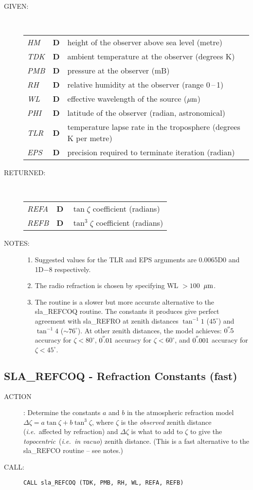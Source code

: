 \documentclass[11pt,twoside]{article}
\newcommand{\xlabel}[1]{}
\newcommand{\arcsec}[2] {\arcseci{#1}$\hspace{-0.4em}.#2$}
\newcommand{\arcsec}[2] {
      {$#1\hspace{-0.05em}^{'\hspace{-0.1em}'}\hspace{-0.4em}.#2$}
   }
\newcommand{\arcseci}[1] {$#1\hspace{-0.05em}$\raisebox{-0.5ex}
                         {$^{'\hspace{-0.1em}'}$}}
\renewcommand{\arcseci}[1] {$#1\hspace{-0.05em}^{'\hspace{-0.1em}'}$}
\newcommand{\routine}[3]
{\hbadness=10000
  \vbox
  {
    \rule{\textwidth}{0.3mm}\\
    {\Large {\bf #1} \hfill #2 \hfill {\bf #1}}\\
    \setlength{\oldspacing}{\topsep}
    \setlength{\topsep}{0.3ex}
    \begin{description}
      #3
    \end{description}
    \setlength{\topsep}{\oldspacing}
  }
}
\renewcommand{\routine}[3]
   {
      \subsection{#1\xlabel{#1} - #2\label{#1}}
       \begin{description}
         #3
       \end{description}
   }
\newcommand{\action}[1]
{\item[ACTION]: #1}
\newcommand{\action}[1]
   {\item[ACTION:] #1}
\newcommand{\call}[1]
{\item[CALL]: \hspace{0.4em}{\tt #1}}
\newlength{\oldspacing}
\renewcommand{\call}[1]
   {
    \item[CALL:] {\tt #1}
   }
\newcommand{\args}[2]
{
  \goodbreak
  \setlength{\oldspacing}{\topsep}
  \setlength{\topsep}{0.3ex}
  \begin{description}
  \item[#1]:\\[1.5ex]
    \begin{tabular}{p{7em}p{6em}p{22em}}
      #2
    \end{tabular}
  \end{description}
  \setlength{\topsep}{\oldspacing}
}
\renewcommand{\args}[2]
   {
     \begin{description}
        \item[#1:]\\
        \begin{tabular}{p{7em}p{6em}l}
           #2
        \end{tabular}
     \end{description}
   }
\newcommand{\spec}[3]
{
  {\em {#1}} & {\bf \mbox{#2}} & {#3}
}
\newcommand{\notes}[1]
{
  \goodbreak
  \setlength{\oldspacing}{\topsep}
  \setlength{\topsep}{0.3ex}
  \begin{description}
    \item[NOTES]:
        #1
  \end{description}
  \setlength{\topsep}{\oldspacing}
}
\renewcommand{\notes}[1]
   {
      \begin{description}
         \item[NOTES:]
            #1
      \end{description}
   }
\begin{document}
\args{GIVEN}
{
 \spec{HM}{D}{height of the observer above sea level (metre)} \\
 \spec{TDK}{D}{ambient temperature at the observer (degrees K)} \\
 \spec{PMB}{D}{pressure at the observer (mB)} \\
 \spec{RH}{D}{relative humidity at the observer (range 0\,--\,1)} \\
 \spec{WL}{D}{effective wavelength of the source ($\mu{\rm m}$)} \\
 \spec{PHI}{D}{latitude of the observer (radian, astronomical)} \\
 \spec{TLR}{D}{temperature lapse rate in the troposphere
                                     (degrees K per metre)} \\
 \spec{EPS}{D}{precision required to terminate iteration (radian)}
}
\args{RETURNED}
{
 \spec{REFA}{D}{$\tan \zeta$ coefficient (radians)} \\
 \spec{REFB}{D}{$\tan^{3} \zeta$ coefficient (radians)}
}
\notes
{
 \begin{enumerate}
  \item Suggested values for the TLR and EPS arguments are 0.0065D0 and
        1D$-$8 respectively.
  \item The radio refraction is chosen by specifying WL $>100$~$\mu{\rm m}$.
  \item The routine is a slower but more accurate alternative to the
        sla\_REFCOQ routine.  The constants it produces give perfect
        agreement with sla\_REFRO at zenith distances
        $\tan^{-1} 1$ ($45^\circ$) and $\tan^{-1} 4$ ($\sim 76^\circ$).
        At other zenith distances, the model achieves:
        \arcsec{0}{5} accuracy for $\zeta<80^{\circ}$,
        \arcsec{0}{01} accuracy for $\zeta<60^{\circ}$, and
        \arcsec{0}{001} accuracy for $\zeta<45^{\circ}$.
 \end{enumerate}
}
\routine{SLA\_REFCOQ}{Refraction Constants (fast)}
{
 \action{Determine the constants $a$ and $b$ in the
         atmospheric refraction model
         $\Delta \zeta = a \tan \zeta + b \tan^{3} \zeta$,
         where $\zeta$ is the {\it observed}\/ zenith distance
         ({\it i.e.}\ affected by refraction) and $\Delta \zeta$ is
         what to add to $\zeta$ to give the {\it topocentric}\,
         ({\it i.e.\ in vacuo}) zenith distance. (This is a fast
         alternative to the sla\_REFCO routine -- see notes.)}
 \call{CALL sla\_REFCOQ (TDK, PMB, RH, WL, REFA, REFB)}
}
\end{document}
